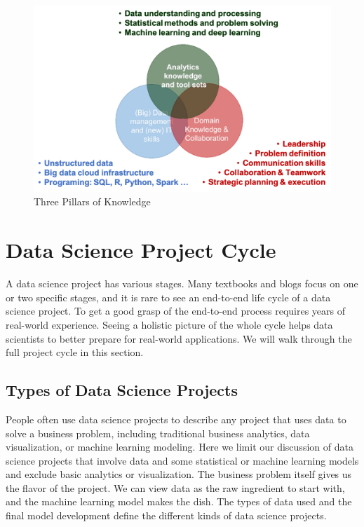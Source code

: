 \documentclass[
  12pt,
]{krantz}
\begin{document}
\begin{figure}

{\centering \includegraphics[width=0.8\linewidth]{images/softskill2} 

}

\caption{Three Pillars of Knowledge}\label{fig:threepillars}
\end{figure}

\hypertarget{data-science-project-cycle}{%
\section{Data Science Project Cycle}\label{data-science-project-cycle}}

A data science project has various stages. Many textbooks and blogs focus on one or two specific stages, and it is rare to see an end-to-end life cycle of a data science project. To get a good grasp of the end-to-end process requires years of real-world experience. Seeing a holistic picture of the whole cycle helps data scientists to better prepare for real-world applications. We will walk through the full project cycle in this section.

\hypertarget{types-of-data-science-projects}{%
\subsection{Types of Data Science Projects}\label{types-of-data-science-projects}}

People often use data science projects to describe any project that uses data to solve a business problem, including traditional business analytics, data visualization, or machine learning modeling. Here we limit our discussion of data science projects that involve data and some statistical or machine learning models and exclude basic analytics or visualization. The business problem itself gives us the flavor of the project. We can view data as the raw ingredient to start with, and the machine learning model makes the dish. The types of data used and the final model development define the different kinds of data science projects.
\end{document}
